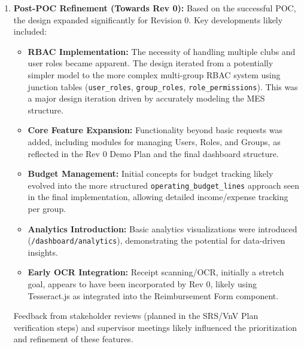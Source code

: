 \documentclass{article}
\begin{document}
\begin{enumerate}
    \item \textbf{Post-POC Refinement (Towards Rev 0):} Based on the successful POC, the design expanded significantly for Revision 0. Key developments likely included:
        \begin{itemize}
            \item \textbf{RBAC Implementation:} The necessity of handling multiple clubs and user roles became apparent. The design iterated from a potentially simpler model to the more complex multi-group RBAC system using junction tables (\texttt{user\_roles}, \texttt{group\_roles}, \texttt{role\_permissions}). This was a major design iteration driven by accurately modeling the MES structure.
            \item \textbf{Core Feature Expansion:} Functionality beyond basic requests was added, including modules for managing Users, Roles, and Groups, as reflected in the Rev 0 Demo Plan and the final dashboard structure.
            \item \textbf{Budget Management:} Initial concepts for budget tracking likely evolved into the more structured \texttt{operating\_budget\_lines} approach seen in the final implementation, allowing detailed income/expense tracking per group.
            \item \textbf{Analytics Introduction:} Basic analytics visualizations were introduced (\texttt{/dashboard/analytics}), demonstrating the potential for data-driven insights.
            \item \textbf{Early OCR Integration:} Receipt scanning/OCR, initially a stretch goal, appears to have been incorporated by Rev 0, likely using Tesseract.js as integrated into the Reimbursement Form component.
        \end{itemize}
        Feedback from stakeholder reviews (planned in the SRS/VnV Plan verification steps) and supervisor meetings likely influenced the prioritization and refinement of these features.


\end{enumerate}
\end{document}
